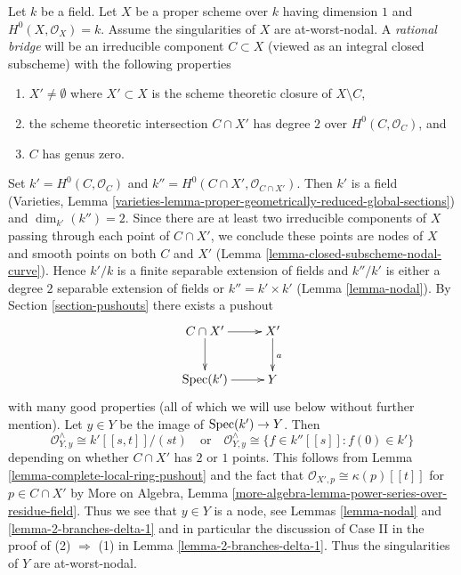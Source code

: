 \begin{example}
\label{example-rational-bridge}
Let $k$ be a field. Let $X$ be a proper scheme over $k$ having dimension $1$
and $H^0(X, \mathcal{O}_X) = k$. Assume the singularities of $X$ are
at-worst-nodal.
A {\it rational bridge} will be an irreducible component $C \subset X$
(viewed as an integral closed subscheme) with the following properties
\begin{enumerate}
\item $X' \not = \emptyset$ where $X' \subset X$ is the scheme theoretic closure
of $X \setminus C$,
\item the scheme theoretic intersection $C \cap X'$
has degree $2$ over $H^0(C, \mathcal{O}_C)$, and
\item $C$ has genus zero.
\end{enumerate}
Set $k' = H^0(C, \mathcal{O}_C)$ and
$k'' = H^0(C \cap X', \mathcal{O}_{C \cap X'})$.
Then $k'$ is a field (Varieties, Lemma
\ref{varieties-lemma-proper-geometrically-reduced-global-sections})
and $\dim_{k'}(k'') = 2$. Since there are at least
two irreducible components of $X$ passing through
each point of $C \cap X'$, we conclude these points are nodes of $X$
and smooth points on both $C$ and $X'$
(Lemma \ref{lemma-closed-subscheme-nodal-curve}).
Hence $k'/k$ is a finite separable extension of fields
and $k''/k'$ is either a degree $2$ separable extension of fields
or $k'' = k' \times k'$ (Lemma \ref{lemma-nodal}). By
Section \ref{section-pushouts} there exists a pushout
$$
\xymatrix{
C \cap X' \ar[r] \ar[d] &
X' \ar[d]^a \\
\Spec(k') \ar[r] &
Y
}
$$
with many good properties (all of which we will use below without
further mention). Let $y \in Y$ be the image of $\mathop{\mathrm{Spec}}(k') \to Y$.
Then
$$
\mathcal{O}_{Y, y}^\wedge \cong k'[[s, t]]/(st)
\quad\text{or}\quad
\mathcal{O}_{Y, y}^\wedge \cong
\{f \in k''[[s]] : f(0) \in k'\}
$$
depending on whether $C \cap X'$ has $2$ or $1$ points.
This follows from Lemma \ref{lemma-complete-local-ring-pushout}
and the fact that $\mathcal{O}_{X', p} \cong \kappa(p)[[t]]$
for $p \in C \cap X'$ by More on Algebra, Lemma
\ref{more-algebra-lemma-power-series-over-residue-field}.
Thus we see that $y \in Y$ is a node, see Lemmas \ref{lemma-nodal}
and \ref{lemma-2-branches-delta-1} and in particular the discussion
of Case II in the proof of (2) $\Rightarrow$ (1) in
Lemma \ref{lemma-2-branches-delta-1}.
Thus the singularities of $Y$ are at-worst-nodal.


\end{example}
